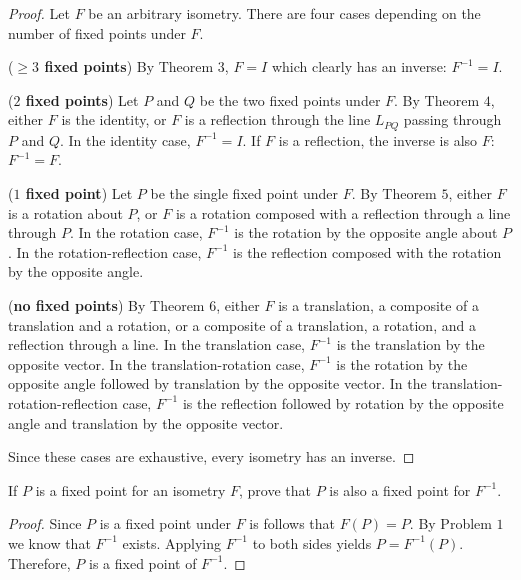 \begin{proof}
    Let $F$ be an arbitrary isometry.
    There are four cases depending on the number of 
        fixed points under $F$.

    (\textbf{$\ge3$ fixed points}) By Theorem $3$, $F = I$
        which clearly has an inverse: $F^{-1} = I$.

    (\textbf{$2$ fixed points}) 
        Let $P$ and $Q$ be the two fixed points under $F$.
        By Theorem $4$, either $F$ is the identity, or $F$ is a reflection
        through the line $L_{PQ}$ passing through $P$ and $Q$.
        In the identity case, $F^{-1} = I$.
        If $F$ is a reflection, the inverse is also $F$: $F^{-1} = F$.

    (\textbf{$1$ fixed point}) 
        Let $P$ be the single fixed point under $F$.
        By Theorem $5$, either $F$ is a rotation about $P$, or 
        $F$ is a rotation composed with a reflection through a line through $P$.
        In the rotation case, $F^{-1}$ is the rotation by the opposite angle about $P$.
        In the rotation-reflection case, $F^{-1}$ is the reflection composed with the rotation by the opposite angle.

    (\textbf{no fixed points})
        By Theorem $6$, either $F$ is a translation,
            a composite of a translation and a rotation,
            or a composite of a translation, a rotation, and a reflection through a line.
        In the translation case, $F^{-1}$ is the translation by the opposite vector.
        In the translation-rotation case, $F^{-1}$ is the rotation by the opposite angle followed by translation by the opposite vector.
        In the translation-rotation-reflection case, $F^{-1}$ is the reflection followed by rotation by the opposite angle and translation by the opposite vector.

    Since these cases are exhaustive, every isometry has an inverse.
\end{proof}

\begin{tcolorbox}[title=Problem 2, breakable]
    If $P$ is a fixed point for an isometry $F$,
        prove that $P$ is also a fixed point 
        for $F^{-1}$.
\end{tcolorbox}

\begin{proof}
    Since $P$ is a fixed point under $F$ is follows that $F(P) = P$.
    By Problem $1$ we know that $F^{-1}$ exists.
    Applying $F^{-1}$ to both sides yields $P = F^{-1}(P)$.
    Therefore, $P$ is a fixed point of $F^{-1}$.
\end{proof}

